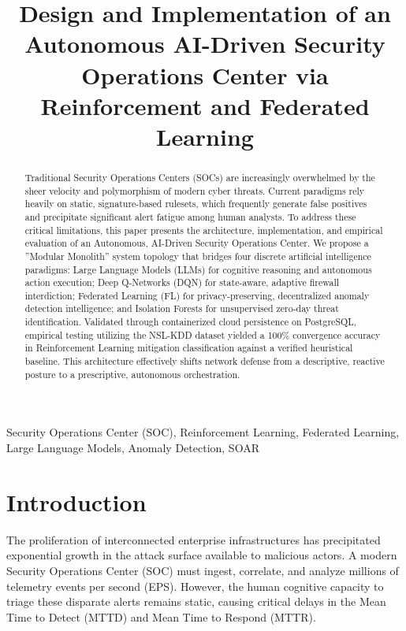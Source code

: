 \documentclass[conference]{IEEEtran}
\begin{document}
\title{Design and Implementation of an Autonomous AI-Driven Security Operations Center via Reinforcement and Federated Learning\\
}

\author{
}

\maketitle

\begin{abstract}
Traditional Security Operations Centers (SOCs) are increasingly overwhelmed by the sheer velocity and polymorphism of modern cyber threats. Current paradigms rely heavily on static, signature-based rulesets, which frequently generate false positives and precipitate significant alert fatigue among human analysts. To address these critical limitations, this paper presents the architecture, implementation, and empirical evaluation of an Autonomous, AI-Driven Security Operations Center. We propose a ''Modular Monolith'' system topology that bridges four discrete artificial intelligence paradigms: Large Language Models (LLMs) for cognitive reasoning and autonomous action execution; Deep Q-Networks (DQN) for state-aware, adaptive firewall interdiction; Federated Learning (FL) for privacy-preserving, decentralized anomaly detection intelligence; and Isolation Forests for unsupervised zero-day threat identification. Validated through containerized cloud persistence on PostgreSQL, empirical testing utilizing the NSL-KDD dataset yielded a 100\% convergence accuracy in Reinforcement Learning mitigation classification against a verified heuristical baseline. This architecture effectively shifts network defense from a descriptive, reactive posture to a prescriptive, autonomous orchestration.
\end{abstract}

\begin{IEEEkeywords}
Security Operations Center (SOC), Reinforcement Learning, Federated Learning, Large Language Models, Anomaly Detection, SOAR
\end{IEEEkeywords}

\section{Introduction}
The proliferation of interconnected enterprise infrastructures has precipitated exponential growth in the attack surface available to malicious actors. A modern Security Operations Center (SOC) must ingest, correlate, and analyze millions of telemetry events per second (EPS). However, the human cognitive capacity to triage these disparate alerts remains static, causing critical delays in the Mean Time to Detect (MTTD) and Mean Time to Respond (MTTR).
\end{document}

